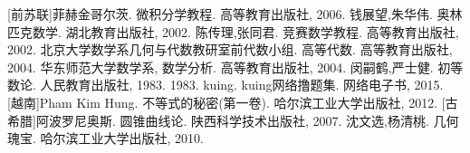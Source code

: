 
\begin{thebibliography}{99}
    [前苏联]菲赫金哥尔茨. 微积分学教程. 高等教育出版社, 2006.
    钱展望,朱华伟. 奥林匹克数学. 湖北教育出版社, 2002.
    陈传理,张同君. 竞赛数学教程. 高等教育出版社, 2002.
    北京大学数学系几何与代数教研室前代数小组. 高等代数. 高等教育出版社, 2004.
    华东师范大学数学系, 数学分析. 高等教育出版社, 2004.
    闵嗣鹤,严士健. 初等数论. 人民教育出版社, 1983. 1983.
    kuing. kuing网络撸题集. 网络电子书, 2015.
   [越南]Pham Kim Hung. 不等式的秘密(第一卷). 哈尔滨工业大学出版社, 2012.
   [古希腊]阿波罗尼奥斯. 圆锥曲线论. 陕西科学技术出版社, 2007.
   沈文选,杨清桃. 几何瑰宝. 哈尔滨工业大学出版社, 2010.
\end{thebibliography}



